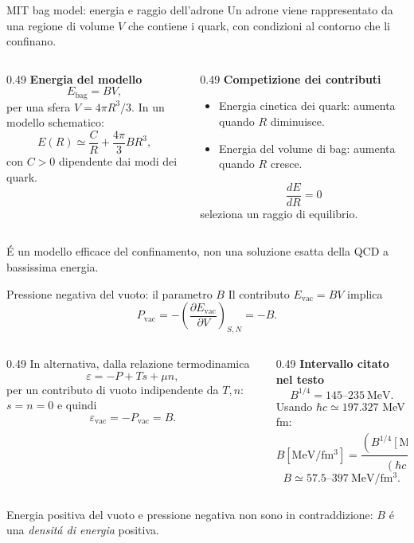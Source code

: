 \begin{frame}{MIT bag model: energia e raggio dell'adrone}
\small
Un adrone viene rappresentato da una regione di volume $V$ che
contiene i quark, con condizioni al contorno che li confinano.
\begin{columns}[T,onlytextwidth]
\begin{column}{0.49\textwidth}
\textbf{Energia del modello}
\[
E_{\mathrm{bag}}=BV,
\]
per una sfera $V=4\pi R^3/3$.
In un modello schematico:
\[
E(R)\simeq\frac{C}{R}+\frac{4\pi}{3}BR^3,
\]
con $C>0$ dipendente dai modi dei quark.
\end{column}
\begin{column}{0.49\textwidth}
\textbf{Competizione dei contributi}
\begin{itemize}
\item Energia cinetica dei quark:
      aumenta quando $R$ diminuisce.
\item Energia del volume di bag:
      aumenta quando $R$ cresce.
\end{itemize}
\[
\frac{dE}{dR}=0
\]
seleziona un raggio di equilibrio.
\end{column}
\end{columns}
\medskip
\'E un modello efficace del confinamento, non una soluzione esatta
della QCD a bassissima energia.
\end{frame}

\begin{frame}{Pressione negativa del vuoto: il parametro $B$}
\small
Il contributo $E_{\mathrm{vac}}=BV$ implica
\[
P_{\mathrm{vac}}=-\left(\frac{\partial E_{\mathrm{vac}}}
{\partial V}\right)_{S,N}=-B.
\]
\begin{columns}[T,onlytextwidth]
\begin{column}{0.49\textwidth}
In alternativa, dalla relazione termodinamica
\[
\varepsilon=-P+Ts+\mu n,
\]
per un contributo di vuoto indipendente da
$T,n$: $s=n=0$ e quindi
\[
\varepsilon_{\mathrm{vac}}=-P_{\mathrm{vac}}=B.
\]
\end{column}
\begin{column}{0.49\textwidth}
\textbf{Intervallo citato nel testo}
\[
B^{1/4}=145\text{--}235\ \mathrm{MeV}.
\]
Usando $\hbar c\simeq197.327$ MeV fm:
\[
B[\mathrm{MeV/fm^3}]
=\frac{(B^{1/4}[\mathrm{MeV}])^4}
{(\hbar c)^3}.
\]
\[
B\simeq57.5\text{--}397\ \mathrm{MeV/fm^3}.
\]
\end{column}
\end{columns}
\medskip
Energia positiva del vuoto e pressione negativa non sono in
contraddizione: $B$ \'e una \emph{densit\'a di energia} positiva.
\end{frame}

